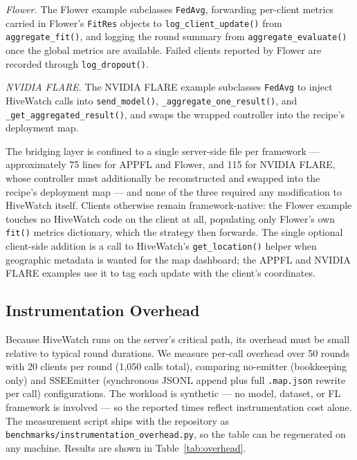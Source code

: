 \textit{Flower.} The Flower example subclasses \texttt{FedAvg}, forwarding per-client metrics carried in Flower's \texttt{FitRes} objects to \texttt{log\_client\_update()} from \texttt{aggregate\_fit()}, and logging the round summary from \texttt{aggregate\_evaluate()} once the global metrics are available. Failed clients reported by Flower are recorded through \texttt{log\_dropout()}.

\textit{NVIDIA FLARE.} The NVIDIA FLARE example subclasses \texttt{FedAvg} to inject HiveWatch calls into \texttt{send\_model()}, \texttt{\_aggregate\_one\_result()}, and \texttt{\_get\_aggregated\_result()}, and swaps the wrapped controller into the recipe's deployment map.

The bridging layer is confined to a single server-side file per framework --- approximately 75 lines for APPFL and Flower, and 115 for NVIDIA FLARE, whose controller must additionally be reconstructed and swapped into the recipe's deployment map --- and none of the three required any modification to HiveWatch itself. Clients otherwise remain framework-native: the Flower example touches no HiveWatch code on the client at all, populating only Flower's own \texttt{fit()} metrics dictionary, which the strategy then forwards. The single optional client-side addition is a call to HiveWatch's \texttt{get\_location()} helper when geographic metadata is wanted for the map dashboard; the APPFL and NVIDIA FLARE examples use it to tag each update with the client's coordinates.

\subsection{Instrumentation Overhead}

Because HiveWatch runs on the server's critical path, its overhead must be small relative to typical round durations. We measure per-call overhead over 50 rounds with 20 clients per round (1{,}050 calls total), comparing no-emitter (bookkeeping only) and SSEEmitter (synchronous JSONL append plus full \texttt{.map.json} rewrite per call) configurations. The workload is synthetic --- no model, dataset, or FL framework is involved --- so the reported times reflect instrumentation cost alone. The measurement script ships with the repository as \texttt{benchmarks/instrumentation\_overhead.py}, so the table can be regenerated on any machine. Results are shown in Table~\ref{tab:overhead}.

